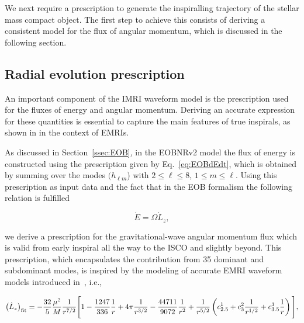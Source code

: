 We next require a prescription to generate the inspiralling trajectory of the stellar mass compact object. The first step to achieve this consists of deriving a consistent model for the flux of angular momentum, which is discussed in the following section.


\subsection{Radial evolution prescription}

An important component of the IMRI waveform model is the prescription used for the fluxes of energy and angular momentum. Deriving an accurate expression for these quantities is essential to capture the main features of true inspirals, as shown in \cite{improved} in the context of EMRIs. 


As discussed in Section~\ref{ssec:EOB}, in the EOBNRv2 model the flux of energy is constructed using the prescription given by Eq.~\eqref{eq:EOBdEdt}, which is obtained by summing over the modes  \(( h_{\ell m}\)) with \(2\leq \ell \leq 8\), \(1\leq m\leq \ell\). Using this prescription as input data and the fact that in the EOB formalism the following relation is fulfilled~\cite{barus}

\begin{equation}
\dot E= \Omega\dot L_z,
\label{circr}
\end{equation}

\noindent we derive a prescription for the gravitational-wave angular momentum flux which is valid from early inspiral all the way to the ISCO and slightly beyond.  This prescription, which encapsulates the contribution from 35 dominant and subdominant modes, is inspired by the modeling of accurate EMRI waveform models introduced in~\cite{improved}, i.e., 

\begin{equation}
\left(\dot L_z\right)_{\rm fit} = -\frac{32}{5}\frac{\mu^2}{M}\frac{1}{r^{7/2}}\Bigg[1-\frac{1247}{336}\frac{1}{r}+4\pi\frac{1}{r^{3/2}}- \frac{44711}{9072}\frac{1}{r^2} + \frac{1}{r^{5/2}}\left(c^1_{2.5} +  c^2_{3}\frac{1}{r^{1/2}}+c^3_{3.5}\frac{1}{r}\right)\Bigg],
\label{lzfluxfit}
\end{equation}

